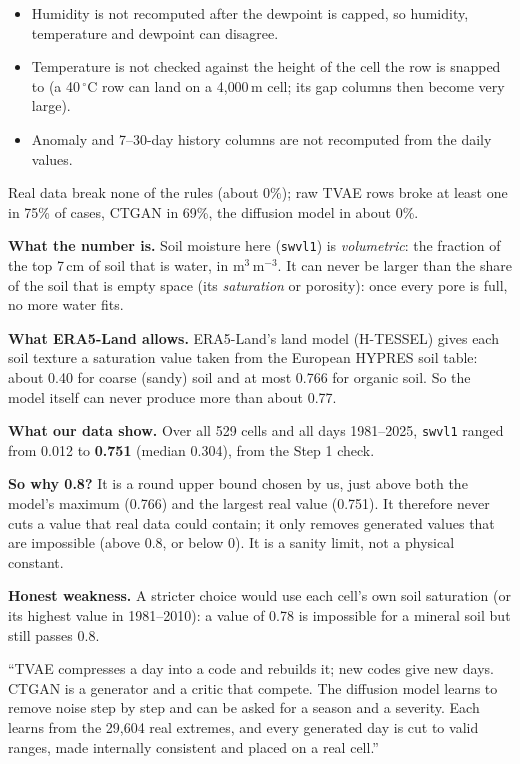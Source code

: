 \begin{keyidea}
\begin{itemize}
  \item Humidity is not recomputed after the dewpoint is capped, so humidity, temperature and dewpoint can disagree.
  \item Temperature is not checked against the height of the cell the row is snapped to (a 40\,$^\circ$C row can land
        on a 4{,}000\,m cell; its gap columns then become very large).
  \item Anomaly and 7--30-day history columns are not recomputed from the daily values.
\end{itemize}
Real data break none of the rules (about 0\%); raw TVAE rows broke at least one in 75\% of cases, CTGAN in 69\%, the
diffusion model in about 0\%.
\end{keyidea}

\begin{keyidea}
\textbf{What the number is.} Soil moisture here (\texttt{swvl1}) is \emph{volumetric}: the fraction of the top 7\,cm
of soil that is water, in m$^3$\,m$^{-3}$. It can never be larger than the share of the soil that is empty space
(its \emph{saturation} or porosity): once every pore is full, no more water fits.

\textbf{What ERA5-Land allows.} ERA5-Land's land model (H-TESSEL) gives each soil texture a saturation value taken
from the European HYPRES soil table: about 0.40 for coarse (sandy) soil and at most 0.766 for organic soil. So the
model itself can never produce more than about 0.77.

\textbf{What our data show.} Over all 529 cells and all days 1981--2025, \texttt{swvl1} ranged from 0.012 to
\textbf{0.751} (median 0.304), from the Step 1 check.

\textbf{So why 0.8?} It is a round upper bound chosen by us, just above both the model's maximum (0.766) and the
largest real value (0.751). It therefore never cuts a value that real data could contain; it only removes generated
values that are impossible (above 0.8, or below 0). It is a sanity limit, not a physical constant.

\textbf{Honest weakness.} A stricter choice would use each cell's own soil saturation (or its highest value in
1981--2010): a value of 0.78 is impossible for a mineral soil but still passes 0.8.
\end{keyidea}

\begin{sayit}
``TVAE compresses a day into a code and rebuilds it; new codes give new days. CTGAN is a generator and a critic that
compete. The diffusion model learns to remove noise step by step and can be asked for a season and a severity. Each
learns from the 29,604 real extremes, and every generated day is cut to valid ranges, made internally consistent and placed on a real cell.''
\end{sayit}
